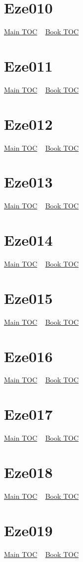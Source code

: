 \documentclass{book}
\begin{document}
  \section{Eze010}\hyperlink{toc}{Main TOC} ~ \hyperref[subsec:Eze]{Book TOC} 
  \section{Eze011}\hyperlink{toc}{Main TOC} ~ \hyperref[subsec:Eze]{Book TOC} 
  \section{Eze012}\hyperlink{toc}{Main TOC} ~ \hyperref[subsec:Eze]{Book TOC} 
  \section{Eze013}\hyperlink{toc}{Main TOC} ~ \hyperref[subsec:Eze]{Book TOC} 
  \section{Eze014}\hyperlink{toc}{Main TOC} ~ \hyperref[subsec:Eze]{Book TOC} 
  \section{Eze015}\hyperlink{toc}{Main TOC} ~ \hyperref[subsec:Eze]{Book TOC} 
  \section{Eze016}\hyperlink{toc}{Main TOC} ~ \hyperref[subsec:Eze]{Book TOC} 
  \section{Eze017}\hyperlink{toc}{Main TOC} ~ \hyperref[subsec:Eze]{Book TOC} 
  \section{Eze018}\hyperlink{toc}{Main TOC} ~ \hyperref[subsec:Eze]{Book TOC} 
  \section{Eze019}\hyperlink{toc}{Main TOC} ~ \hyperref[subsec:Eze]{Book TOC} 
\end{document}

